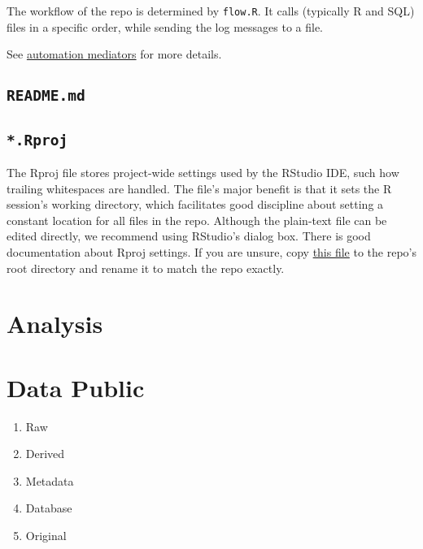 \documentclass[
]{book}
\providecommand{\tightlist}{%
  \setlength{\itemsep}{0pt}\setlength{\parskip}{0pt}}
\begin{document}
The workflow of the repo is determined by \texttt{flow.R}. It calls (typically R and SQL) files in a specific order, while sending the log messages to a file.

See \protect\hyperlink{automation-flow}{automation mediators} for more details.

\hypertarget{repo-readme}{%
\subsection{\texorpdfstring{\texttt{README.md}}{README.md}}\label{repo-readme}}

\hypertarget{repo-rproj}{%
\subsection{\texorpdfstring{\texttt{*.Rproj}}{*.Rproj}}\label{repo-rproj}}

The Rproj file stores project-wide settings used by the RStudio IDE, such how trailing whitespaces are handled. The file's major benefit is that it sets the R session's working directory, which facilitates good discipline about setting a constant location for all files in the repo. Although the plain-text file can be edited directly, we recommend using RStudio's dialog box. There is good documentation about Rproj settings. If you are unsure, copy \href{https://github.com/wibeasley/RAnalysisSkeleton/blob/master/RAnalysisSkeleton.Rproj}{this file} to the repo's root directory and rename it to match the repo exactly.

\hypertarget{repo-analysis}{%
\section{Analysis}\label{repo-analysis}}

\hypertarget{repo-data-public}{%
\section{Data Public}\label{repo-data-public}}

\begin{enumerate}
\def\labelenumi{\arabic{enumi}.}
\tightlist
\item
  Raw
\item
  Derived
\item
  Metadata
\item
  Database
\item
  Original
\end{enumerate}
\end{document}
